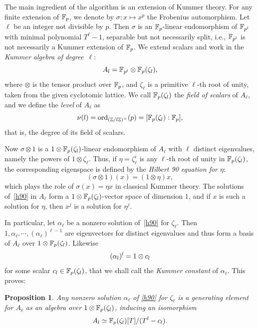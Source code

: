 \documentclass{sig-alternate}
\newtheorem{proposition}[theorem]{Proposition}
\begin{document}
The main ingredient of the algorithm is an extension
of Kummer theory.
For any finite extension of $\mathbb{F}_{p}$, we denote by $ \sigma:x\mapsto x^p $
the Frobenius automorphism.
Let $\ell$ be an integer not divisible by $p$.
Then $\sigma$ is an $\mathbb{F}_{p}$-linear endomorphism of $\mathbb{F}_{p^l}$
with minimal polynomial $T^\ell-1$, separable but not necessarily split,
i.e., $\mathbb{F}_{p^l}$ is not necessarily a Kummer extension of $\mathbb{F}_{p}$.
We extend scalars and work in the
\emph{Kummer algebra of degree~$\ell$}:
\[
  A_l = \mathbb{F}_{p^l}\otimes\mathbb{F}_{p}(\zeta_l),
\]
where $\otimes$ is the tensor product over $\mathbb{F}_{p}$, and $\zeta_\ell$ is a primitive
$\ell$-th root of unity, taken from the given cyclotomic lattice. We
call $\mathbb{F}_{p}(\zeta_l)$ the \emph{field of scalars} of $A_\ell$, and
we define the \emph{level} of $A_\ell$ as
\[
  \nu(l) = \mathrm{ord}_{(\mathbb{Z}/l\mathbb{Z})^\times}(p) = [\mathbb{F}_{p}(\zeta_l):\mathbb{F}_{p}],
\]
that is, the degree of its field of scalars.

Now $\sigma\otimes1$ is a $1\otimes\mathbb{F}_{p}(\zeta_l)$-linear endomorphism of $A_\ell$
with $\ell$ distinct eigenvalues, namely the powers of $1\otimes\zeta_\ell$.
Thus, if $\eta=\zeta_\ell^i$ is any $\ell$-th root of unity in $\mathbb{F}_{p}(\zeta_l)$,
the corresponding eigenspace is defined by the \emph{Hilbert 90 equation for $\eta$}:
\begin{equation}
  \tag{H90}
 (\sigma\otimes1)(x) = (1\otimes\eta)x,
  \label{h90}
\end{equation}
which plays the role of $\sigma(x)=\eta x$ in classical Kummer theory.
The solutions of~\eqref{h90} in $A_\ell$ form a
$1\otimes\mathbb{F}_{p}(\zeta_{l})$-vector space of dimension $1$,
and if $x$ is such a solution for $\eta$, then $x^j$ is a solution for $\eta^j$.

In particular, let $\alpha_\ell$ be a nonzero solution of~\eqref{h90} for $\zeta_\ell$.
Then $1,\alpha_\ell,\cdots,(\alpha_\ell)^{\ell-1}$ are eigenvectors for distinct eigenvalues and thus
form a basis of $A_\ell$ over $1\otimes\mathbb{F}_{p}(\zeta_{l})$.
Likewise
\[ (\alpha_l)^l = 1\otimes c_l \]
for some scalar $c_l\in\mathbb{F}_{p}(\zeta_l)$,
that we shall call the \emph{Kummer constant} of $\alpha_\ell$.
This proves:
\begin{proposition}
\label{alphagen}
Any nonzero solution $\alpha_\ell$ of \eqref{h90} for $\zeta_\ell$ is a generating element for $A_\ell$ as an algebra over $1\otimes\mathbb{F}_{p}(\zeta_{l})$,
inducing an isomorphism
\[ A_l\simeq \mathbb{F}_{p}(\zeta_{l})[T]/(T^l-c_l). \]
\end{proposition}
\end{document}
